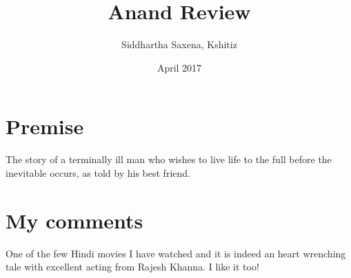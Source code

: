 \documentclass{article}
\title{Anand Review}
\author{Siddhartha Saxena, Kshitiz}
\date{April 2017}
\begin{document}
\maketitle

\section{Premise}
The story of a terminally ill man who wishes to live life to the full before the inevitable occurs, as told by his best friend.
\section{My comments}
One of the few Hindi movies I have watched and it is indeed an heart wrenching tale with excellent acting from Rajesh Khanna.
I like it too!
\end{document}

